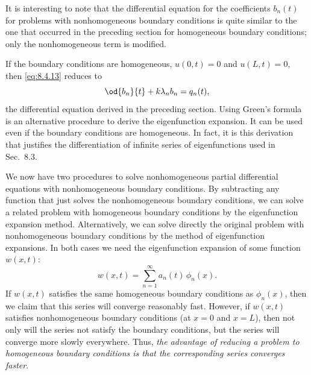It is interesting to note that the differential equation for the coefficients $b_n(t)$ for problems with nonhomogeneous boundary conditions is quite similar to the one that occurred in the preceding section for homogeneous boundary conditions; only the nonhomogeneous term is modified.

If the boundary conditions are homogeneous, $u(0,t) = 0$ and $u(L,t) = 0$, then \eqref{eq:8.4.13} reduces to
\[
\od{b_n}{t} + k\lambda_n b_n = q_n(t),
\]
the differential equation derived in the preceding section.  Using Green's formula is an alternative procedure to derive the eigenfunction expansion.  It can be used even if the boundary conditions are homogeneous.  In fact, it is this derivation that justifies the differentiation of infinite series of eigenfunctions used in Sec.~8.3.

We now have two procedures to solve nonhomogeneous partial differential equations with nonhomogeneous boundary conditions.  By subtracting any function that just solves the nonhomogeneous boundary conditions, we can solve a related problem with homogeneous boundary conditions by the eigenfunction expansion method.  Alternatively, we can solve directly the original problem with nonhomogeneous boundary conditions by the method of eigenfunction expansions.  In both cases we need the eigenfunction expansion of some function $w(x,t)$:
\[
w(x,t) = \sum_{n=1}^{\infty} a_n(t)\,\phi_n(x).
\]
If $w(x,t)$ satisfies the same homogeneous boundary conditions as $\phi_n(x)$, then we claim that this series will converge reasonably fast.  However, if $w(x,t)$ satisfies nonhomogeneous boundary conditions (at $x=0$ and $x=L$), then not only will the series not satisfy the boundary conditions, but the series will converge more slowly everywhere.  Thus, \emph{the advantage of reducing a problem to homogeneous boundary conditions is that the corresponding series converges faster}.

